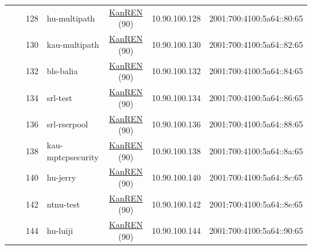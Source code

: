 \begin{small}
\begin{center}
\begin{longtable}{|c|c|c|c|c|c|c|c|}
  &  & \tiny{128} & \multicolumn{1}{|l|}{\tiny{hu-multipath}} & \multicolumn{2}{|c|}{\tiny{\href{http://www.kanren.net}{KanREN} (90)}} & \tiny{10.90.100.128} & \tiny{2001:700:4100:5a64::80:65} \\* \cline{3-3}\cline{4-4}\cline{5-5}\cline{6-6}\cline{7-7}\cline{8-8}
  &  & \tiny{130} & \multicolumn{1}{|l|}{\tiny{kau-multipath}} & \multicolumn{2}{|c|}{\tiny{\href{http://www.kanren.net}{KanREN} (90)}} & \tiny{10.90.100.130} & \tiny{2001:700:4100:5a64::82:65} \\* \cline{3-3}\cline{4-4}\cline{5-5}\cline{6-6}\cline{7-7}\cline{8-8}
  &  & \tiny{132} & \multicolumn{1}{|l|}{\tiny{bls-balia}} & \multicolumn{2}{|c|}{\tiny{\href{http://www.kanren.net}{KanREN} (90)}} & \tiny{10.90.100.132} & \tiny{2001:700:4100:5a64::84:65} \\* \cline{3-3}\cline{4-4}\cline{5-5}\cline{6-6}\cline{7-7}\cline{8-8}
  &  & \tiny{134} & \multicolumn{1}{|l|}{\tiny{srl-test}} & \multicolumn{2}{|c|}{\tiny{\href{http://www.kanren.net}{KanREN} (90)}} & \tiny{10.90.100.134} & \tiny{2001:700:4100:5a64::86:65} \\* \cline{3-3}\cline{4-4}\cline{5-5}\cline{6-6}\cline{7-7}\cline{8-8}
  &  & \tiny{136} & \multicolumn{1}{|l|}{\tiny{srl-rserpool}} & \multicolumn{2}{|c|}{\tiny{\href{http://www.kanren.net}{KanREN} (90)}} & \tiny{10.90.100.136} & \tiny{2001:700:4100:5a64::88:65} \\* \cline{3-3}\cline{4-4}\cline{5-5}\cline{6-6}\cline{7-7}\cline{8-8}
  &  & \tiny{138} & \multicolumn{1}{|l|}{\tiny{kau-mptcpsecurity}} & \multicolumn{2}{|c|}{\tiny{\href{http://www.kanren.net}{KanREN} (90)}} & \tiny{10.90.100.138} & \tiny{2001:700:4100:5a64::8a:65} \\* \cline{3-3}\cline{4-4}\cline{5-5}\cline{6-6}\cline{7-7}\cline{8-8}
  &  & \tiny{140} & \multicolumn{1}{|l|}{\tiny{hu-jerry}} & \multicolumn{2}{|c|}{\tiny{\href{http://www.kanren.net}{KanREN} (90)}} & \tiny{10.90.100.140} & \tiny{2001:700:4100:5a64::8c:65} \\* \cline{3-3}\cline{4-4}\cline{5-5}\cline{6-6}\cline{7-7}\cline{8-8}
  &  & \tiny{142} & \multicolumn{1}{|l|}{\tiny{ntnu-test}} & \multicolumn{2}{|c|}{\tiny{\href{http://www.kanren.net}{KanREN} (90)}} & \tiny{10.90.100.142} & \tiny{2001:700:4100:5a64::8e:65} \\* \cline{3-3}\cline{4-4}\cline{5-5}\cline{6-6}\cline{7-7}\cline{8-8}
  &  & \tiny{144} & \multicolumn{1}{|l|}{\tiny{hu-luiji}} & \multicolumn{2}{|c|}{\tiny{\href{http://www.kanren.net}{KanREN} (90)}} & \tiny{10.90.100.144} & \tiny{2001:700:4100:5a64::90:65} \\* \cline{3-3}\cline{4-4}\cline{5-5}\cline{6-6}\cline{7-7}\cline{8-8}

\end{longtable}
\end{center}
\end{small}

